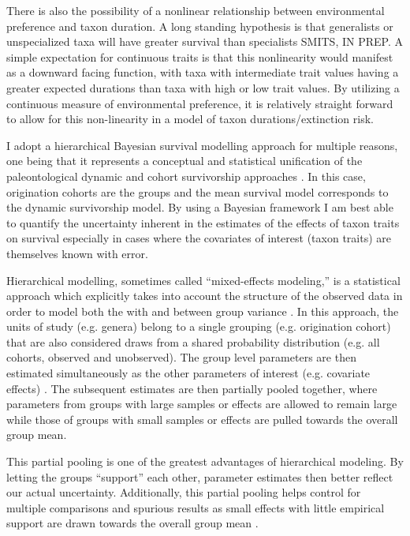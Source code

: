 \documentclass[12pt,letterpaper]{article}
\begin{document}
There is also the possibility of a nonlinear relationship between environmental preference and taxon duration. A long standing hypothesis is that generalists or unspecialized taxa will have greater survival than specialists \citep{Simpson1944,Liow2004a,Nurnberg2013a,Nurnberg2015,Baumiller1993} \uppercase{Smits, in prep}. A simple expectation for continuous traits is that this nonlinearity would manifest as a downward facing function, with taxa with intermediate trait values having a greater expected durations than taxa with high or low trait values. By utilizing a continuous measure of environmental preference, it is relatively straight forward to allow for this non-linearity in a model of taxon durations/extinction risk.


I adopt a hierarchical Bayesian survival modelling approach for multiple reasons, one being that it represents a conceptual and statistical unification of the paleontological dynamic and cohort survivorship approaches \citep{VanValen1973,VanValen1979,Raup1978,Raup1975,Foote1988,Baumiller1993,Simpson2006}. In this case, origination cohorts are the groups and the mean survival model corresponds to the dynamic survivorship model. By using a Bayesian framework I am best able to quantify the uncertainty inherent in the estimates of the effects of taxon traits on survival especially in cases where the covariates of interest (taxon traits) are themselves known with error.

Hierarchical modelling, sometimes called ``mixed-effects modeling,'' is a statistical approach which explicitly takes into account the structure of the observed data in order to model both the with and between group variance \citep{Gelman2013d,Gelman2007}. In this approach, the units of study (e.g. genera) belong to a single grouping (e.g. origination cohort) that are also considered draws from a shared probability distribution (e.g. all cohorts, observed and unobserved). The group level parameters are then estimated simultaneously as the other parameters of interest (e.g. covariate effects) \citep{Gelman2013d}. The subsequent estimates are then partially pooled together, where parameters from groups with large samples or effects are allowed to remain large while those of groups with small samples or effects are pulled towards the overall group mean.

This partial pooling is one of the greatest advantages of hierarchical modeling. By letting the groups ``support'' each other, parameter estimates then better reflect our actual uncertainty. Additionally, this partial pooling helps control for multiple comparisons and spurious results as small effects with little empirical support are drawn towards the overall group mean \citep{Gelman2013d,Gelman2007}. 
\end{document}
